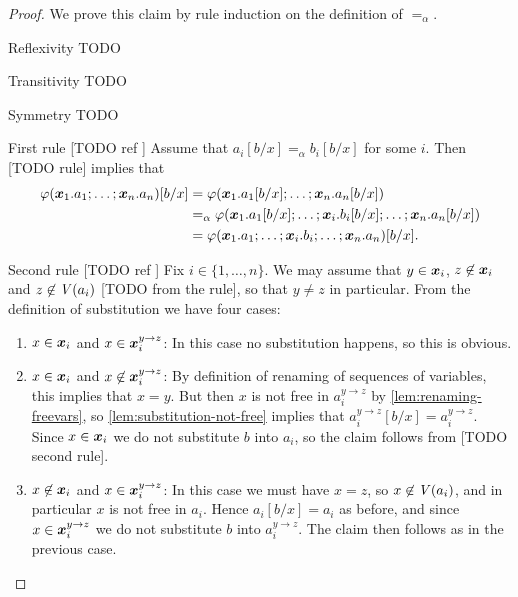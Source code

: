 \documentclass[a4paper, 11pt, article, danish, oneside]{memoir}
\DeclarePairedDelimiter{\auxdelimparen}{(}{)}
\renewcommand{\phi}{\varphi}
\newcommand{\allvar}[2][]{\mathit{V}\auxdelimparen[#1]{#2}}
\begin{document}
\begin{proof}
    We prove this claim by rule induction on the definition of $=_\alpha$.
    \begin{proofsec}
        \item[Reflexivity]
        TODO

        \item[Transitivity]
        TODO

        \item[Symmetry]
        TODO

        \item[First rule [TODO ref]]
        Assume that $a_i[b/x] =_\alpha b_i[b/x]$ for some $i$. Then [TODO rule] implies that
        \begin{align*}
            \phi(\seq{x}_1.a_1 ; \ldots ; \seq{x}_n.a_n)[b/x]
                &= \phi(\seq{x}_1.a_1[b/x] ; \ldots ; \seq{x}_n.a_n[b/x]) \\
                &=_\alpha \phi(\seq{x}_1.a_1[b/x] ; \ldots ; \seq{x}_i.b_i[b/x] ; \ldots ; \seq{x}_n.a_n[b/x]) \\
                &= \phi(\seq{x}_1.a_1 ; \ldots ; \seq{x}_i.b_i ; \ldots ; \seq{x}_n.a_n)[b/x].
        \end{align*}

        \item[Second rule [TODO ref]]
        Fix $i \in \{1, \ldots, n\}$. We may assume that $y \in \bm{x}_i$, $z \not\in \bm{x}_i$ and $z \not\in \allvar{a_i}$ [TODO from the rule], so that $y \neq z$ in particular. From the definition of substitution we have four cases:
        \begin{enumerate}
            \item $x \in \bm{x}_i$ and $x \in \bm{x}_i^{y \to z}$: In this case no substitution happens, so this is obvious.

            \item $x \in \bm{x}_i$ and $x \not\in \bm{x}_i^{y \to z}$: By definition of renaming of sequences of variables, this implies that $x = y$. But then $x$ is not free in $a_i^{y \to z}$ by \cref{lem:renaming-freevars}, so \cref{lem:substitution-not-free} implies that $a_i^{y \to z}[b/x] = a_i^{y \to z}$. Since $x \in \bm{x}_i$ we do not substitute $b$ into $a_i$, so the claim follows from [TODO second rule].

            \item $x \not\in \bm{x}_i$ and $x \in \bm{x}_i^{y \to z}$: In this case we must have $x = z$, so $x \not\in \allvar{a_i}$, and in particular $x$ is not free in $a_i$. Hence $a_i[b/x] = a_i$ as before, and since $x \in \bm{x}_i^{y \to z}$ we do not substitute $b$ into $a_i^{y \to z}$. The claim then follows as in the previous case.


\end{enumerate}
\end{proofsec}
\end{proof}
\end{document}
